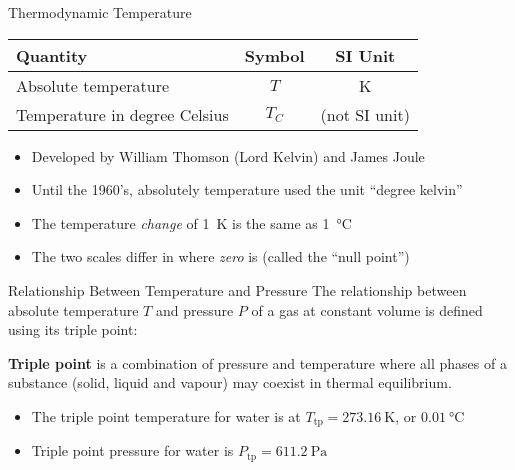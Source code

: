 \documentclass[12pt,aspectratio=169]{beamer}
\newcommand{\eq}[2]{\vspace{#1}{\Large\begin{displaymath}#2\end{displaymath}}}
\begin{document}
\begin{frame}{Thermodynamic Temperature}
  \eq{.01in}{
    \boxed{T = T_C + 273.15}
  }
  \begin{center}
    \begin{tabular}{l|c|c}
      \rowcolor{pink}
      \textbf{Quantity}     & \textbf{Symbol} & \textbf{SI Unit} \\ \hline
      Absolute temperature  & $T$            & \si{\kelvin} \\
      Temperature in degree Celsius & $T_C$  & (not SI unit)
    \end{tabular}
  \end{center}
  \begin{itemize}
  \item Developed by William Thomson (Lord Kelvin) and James Joule
  \item Until the 1960's, absolutely temperature used the unit ``degree kelvin''
  \item The temperature \emph{change} of \SI{1}{\kelvin} is the same as
    \SI{1}{\celsius}
  \item The two scales differ in where \emph{zero} is (called the
    ``null point'')
  \end{itemize}
\end{frame}
  


\begin{frame}{Relationship Between Temperature and Pressure}
  The relationship between absolute temperature $T$ and pressure $P$
  of a gas at constant volume is defined using its triple point:

  \eq{-.1in}{
    T=\frac{T_\mathrm{tp}}{P_\mathrm{tp}}P
  }

  \textbf{Triple point} is a combination of pressure and temperature where all
  phases of a substance (solid, liquid and vapour) may coexist in thermal
  equilibrium.
  \begin{itemize}
  \item The triple point temperature for water is at
    $T_\mathrm{tp}=\SI{273.16}{\kelvin}$, or $\SI{0.01}{\celsius}$
  \item Triple point pressure for water is $P_\mathrm{tp}=\SI{611.2}{\pascal}$
  \end{itemize}
\end{frame}
\end{document}
